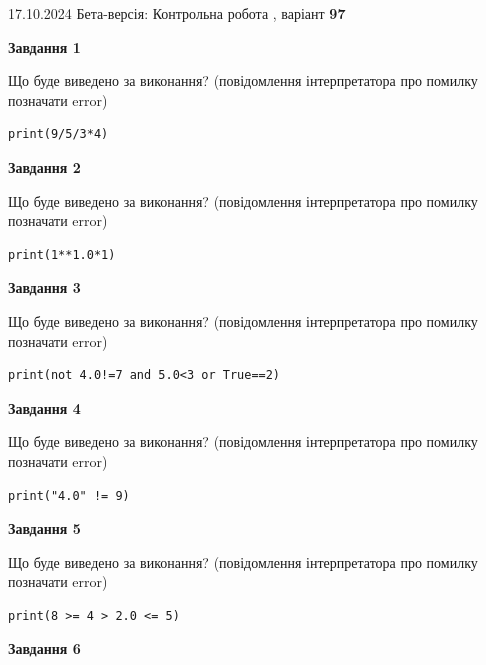 \documentclass[12pt, ukrainian]{article}
\begin{document}
{\Large{17.10.2024 Бета-версія: Контрольна робота , варіант  \No \textbf { 97 }\par}}
{
\begin {large}
{\begin {center}\textbf{Завдання 1}\end {center}}

Що буде виведено за виконання? (повідомлення інтерпретатора про помилку позначати error)\par
\begin{verbatim}
print(9/5/3*4)
\end{verbatim}

{\begin {center}\textbf{Завдання 2}\end {center}}

Що буде виведено за виконання? (повідомлення інтерпретатора про помилку позначати error)\par
\begin{verbatim}
print(1**1.0*1)
\end{verbatim}

{\begin {center}\textbf{Завдання 3}\end {center}}

Що буде виведено за виконання? (повідомлення інтерпретатора про помилку позначати error)\par
\begin{verbatim}
print(not 4.0!=7 and 5.0<3 or True==2)
\end{verbatim}

{\begin {center}\textbf{Завдання 4}\end {center}}

Що буде виведено за виконання? (повідомлення інтерпретатора про помилку позначати error)\par
\begin{verbatim}
print("4.0" != 9)
\end{verbatim}

{\begin {center}\textbf{Завдання 5}\end {center}}

Що буде виведено за виконання? (повідомлення інтерпретатора про помилку позначати error)\par
\begin{verbatim}
print(8 >= 4 > 2.0 <= 5)
\end{verbatim}

{\begin {center}\textbf{Завдання 6}\end {center}}


\end{large}}
\end{document}
